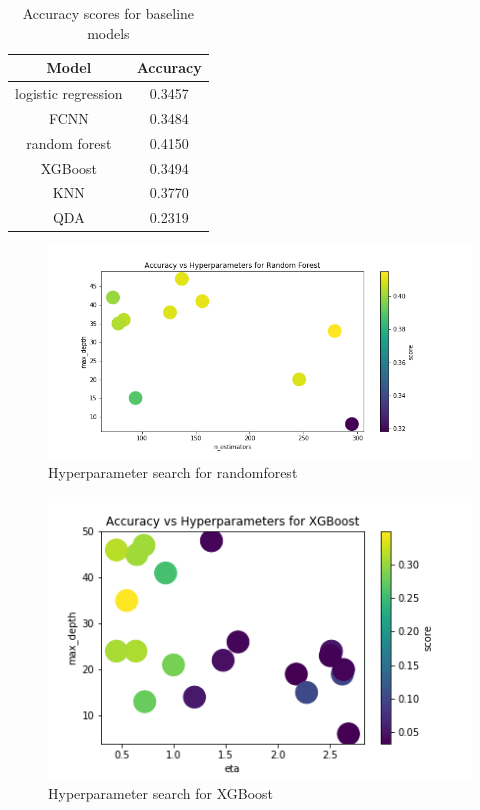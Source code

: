 \documentclass{article}
\begin{document}
\begin{table}
\centering
\begin{tabular}{|c|c|}
    \hline
    Model & Accuracy \\
    \hline
    logistic regression & 0.3457 \\
    \hline
    FCNN & 0.3484 \\
    \hline
    random forest & 0.4150 \\
    \hline
    XGBoost & 0.3494 \\
    \hline
    KNN & 0.3770 \\
    \hline
    QDA & 0.2319 \\
    \hline
\end{tabular}
\caption{Accuracy scores for baseline models}
\label{tab:baseline-results}
\end{table}

\begin{figure}
    \centering
    \includegraphics[width=\linewidth]{visualizations/rf.png}
    \caption{Hyperparameter search for randomforest}
    \label{fig:classical-results}
\end{figure}

\begin{figure}
    \centering
    \includegraphics[width=\linewidth]{visualizations/xgb.png}
    \caption{Hyperparameter search for XGBoost}
    \label{fig:classical-results}
\end{figure}
\end{document}
